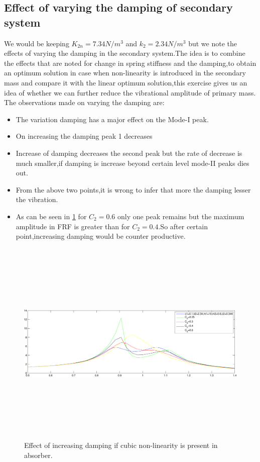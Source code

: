   \subsection{Effect of varying the damping of secondary system }
  We would be keeping $K_{2n}=7.34 N/m^3 $ and $k_2 =2.34 N/m^3$ but we note the effects of varying the damping in the secondary system.The idea is to combine the effects that are noted for change in spring stiffness and the damping,to obtain an optimum solution in case when non-linearity is introduced in the secondary mass and compare it with the linear optimum solution,this exercise gives us an idea of whether we can further reduce the vibrational amplitude of primary mass.
  The observations made on varying the damping are:
  \begin{itemize}
  \item The variation damping has a major effect on the Mode-I peak.
  \item On increasing the damping peak 1 decreases
  \item Increase of damping decreases the second peak but the rate of decrease is much smaller,if damping is increase beyond certain level mode-II peaks dies out.
  \item From the above two points,it is wrong to infer that more the damping lesser the vibration.
  \item As can be seen in \ref{fig:non-linear secondary 3} for $C_2=0.6$ only one peak remains but the maximum amplitude in FRF is greater than for $C_2=0.4$.So after certain point,increasing damping would be counter productive.
  \end{itemize}
  \begin{figure}[h!]
  \includegraphics[width=16cm,height=10cm]{"figures/nonlinearity_secondary_3"}
  \caption{Effect of increasing damping if cubic non-linearity is present in absorber.}
  \label{fig:non-linear secondary 3}
  \end{figure}

